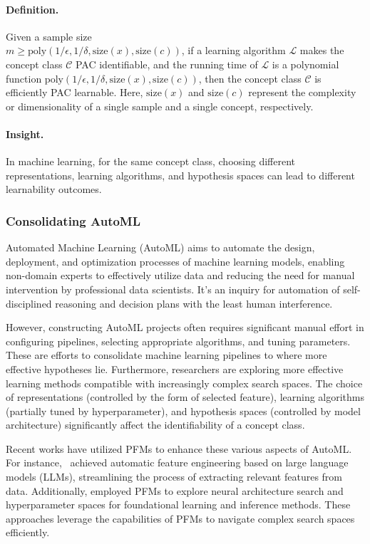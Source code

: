 \paragraph{Definition.} Given a sample size \\ $m \geq \text{poly}(1/\epsilon, 1/ \delta, \text{size}(x), \text{size}(c))$, if a learning algorithm $\mathcal{L}$ makes the concept class $\mathcal{C}$ PAC identifiable, and the running time of $\mathcal{L}$ is a polynomial function $\text{poly}(1/\epsilon, 1/ \delta, \text{size}(x), \text{size}(c))$, then the concept class $\mathcal{C}$ is efficiently PAC learnable. Here, $\text{size}(x)$ and $\text{size}(c)$ represent the complexity or dimensionality of a single sample and a single concept, respectively.

\paragraph{Insight.} In machine learning, for the same concept class, choosing different representations, learning algorithms, and hypothesis spaces can lead to different learnability outcomes.



\subsubsection{Consolidating AutoML}

Automated Machine Learning (AutoML) aims to automate the design, deployment, and optimization processes of machine learning models, enabling non-domain experts to effectively utilize data and reducing the need for manual intervention by professional data scientists. It's an inquiry for automation of self-disciplined reasoning and decision plans with the least human interference.

However, constructing AutoML projects often requires significant manual effort in configuring pipelines, selecting appropriate algorithms, and tuning parameters. These are efforts to consolidate machine learning pipelines to where more effective hypotheses lie. Furthermore, researchers are exploring more effective learning methods compatible with increasingly complex search spaces. The choice of representations (controlled by the form of selected feature), learning algorithms (partially tuned by hyperparameter), and hypothesis spaces (controlled by model architecture) significantly affect the identifiability of a concept class.

Recent works have utilized PFMs to enhance these various aspects of AutoML. For instance,~\cite{Hollmann2023LargeLM} achieved automatic feature engineering based on large language models (LLMs), streamlining the process of extracting relevant features from data. Additionally,\cite{sayed2024gizaml} employed PFMs to explore neural architecture search and hyperparameter spaces for foundational learning and inference methods. These approaches leverage the capabilities of PFMs to navigate complex search spaces efficiently.

